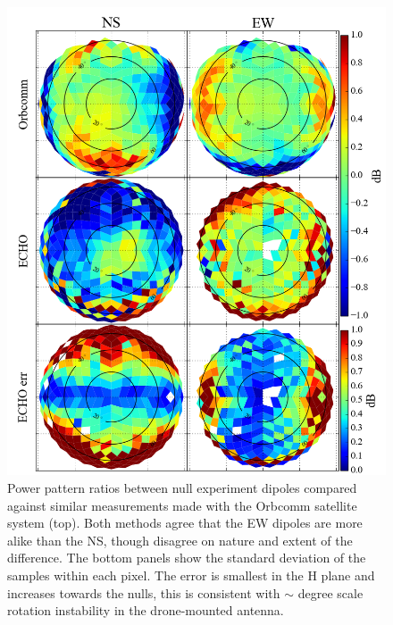 \documentclass[preprint2,numberedappendix,tighten,twocolappendix]{aastex6}
\begin{document}
\begin{figure}
\begin{minipage}{0.45\textwidth}
\centering
\includegraphics[width=\textwidth]{figures/GB_OC_ratio_compare.png}
\caption{Power pattern ratios between null experiment dipoles compared against similar measurements made with the Orbcomm satellite system (top).  Both methods agree that the EW dipoles are more alike than the NS, though disagree on nature and extent of the difference.  The bottom panels show the standard deviation of the samples within each pixel. The error is smallest in the H plane and increases towards the nulls, this is consistent with $\sim$ degree scale rotation instability in the drone-mounted antenna.}\label{fig:GB_ratio_maps}
\end{minipage}
\centering
\begin{minipage}{0.45\textwidth}
\centering

\end{minipage}
\end{figure}
\end{document}
